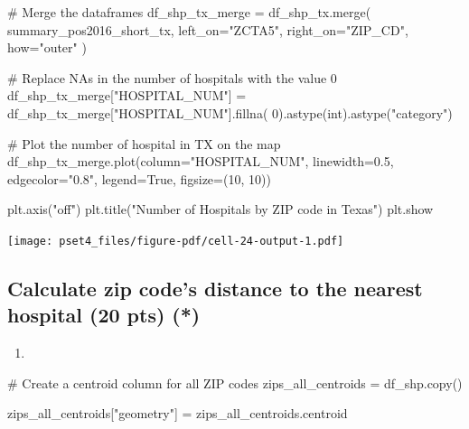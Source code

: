 \documentclass[
  letterpaper,
  DIV=11,
  numbers=noendperiod]{scrartcl}
\newenvironment{Shaded}{\begin{snugshade}}{\end{snugshade}}
\newcommand{\BuiltInTok}[1]{\textcolor[rgb]{0.00,0.23,0.31}{#1}}
\newcommand{\CommentTok}[1]{\textcolor[rgb]{0.37,0.37,0.37}{#1}}
\newcommand{\DecValTok}[1]{\textcolor[rgb]{0.68,0.00,0.00}{#1}}
\newcommand{\FloatTok}[1]{\textcolor[rgb]{0.68,0.00,0.00}{#1}}
\newcommand{\NormalTok}[1]{\textcolor[rgb]{0.00,0.23,0.31}{#1}}
\newcommand{\OperatorTok}[1]{\textcolor[rgb]{0.37,0.37,0.37}{#1}}
\newcommand{\StringTok}[1]{\textcolor[rgb]{0.13,0.47,0.30}{#1}}
\newcommand{\VariableTok}[1]{\textcolor[rgb]{0.07,0.07,0.07}{#1}}
\providecommand{\tightlist}{%
  \setlength{\itemsep}{0pt}\setlength{\parskip}{0pt}}\usepackage{longtable,booktabs,array}
\begin{document}
\begin{Shaded}
\begin{Highlighting}[]
\CommentTok{\# Merge the dataframes}
\NormalTok{df\_shp\_tx\_merge }\OperatorTok{=}\NormalTok{ df\_shp\_tx.merge(}
\NormalTok{    summary\_pos2016\_short\_tx,}
\NormalTok{    left\_on}\OperatorTok{=}\StringTok{"ZCTA5"}\NormalTok{,}
\NormalTok{    right\_on}\OperatorTok{=}\StringTok{"ZIP\_CD"}\NormalTok{,}
\NormalTok{    how}\OperatorTok{=}\StringTok{"outer"}
\NormalTok{)}

\CommentTok{\# Replace NAs in the number of hospitals with the value 0}
\NormalTok{df\_shp\_tx\_merge[}\StringTok{"HOSPITAL\_NUM"}\NormalTok{] }\OperatorTok{=}\NormalTok{ df\_shp\_tx\_merge[}\StringTok{"HOSPITAL\_NUM"}\NormalTok{].fillna(}
    \DecValTok{0}\NormalTok{).astype(}\BuiltInTok{int}\NormalTok{).astype(}\StringTok{"category"}\NormalTok{)}

\CommentTok{\# Plot the number of hospital in TX on the map}
\NormalTok{df\_shp\_tx\_merge.plot(column}\OperatorTok{=}\StringTok{"HOSPITAL\_NUM"}\NormalTok{, linewidth}\OperatorTok{=}\FloatTok{0.5}\NormalTok{,}
\NormalTok{                     edgecolor}\OperatorTok{=}\StringTok{"0.8"}\NormalTok{, legend}\OperatorTok{=}\VariableTok{True}\NormalTok{, figsize}\OperatorTok{=}\NormalTok{(}\DecValTok{10}\NormalTok{, }\DecValTok{10}\NormalTok{))}

\NormalTok{plt.axis(}\StringTok{"off"}\NormalTok{)}
\NormalTok{plt.title(}\StringTok{"Number of Hospitals by ZIP code in Texas"}\NormalTok{)}
\NormalTok{plt.show}
\end{Highlighting}
\end{Shaded}

\texttt{[image: pset4\_files/figure-pdf/cell-24-output-1.pdf]}

\subsection{Calculate zip code's distance to the nearest hospital (20
pts)
(*)}\label{calculate-zip-codes-distance-to-the-nearest-hospital-20-pts}

\begin{enumerate}
\def\labelenumi{\arabic{enumi}.}
\tightlist
\item
\end{enumerate}

\begin{Shaded}
\begin{Highlighting}[]
\CommentTok{\# Create a centroid column for all ZIP codes}
\NormalTok{zips\_all\_centroids }\OperatorTok{=}\NormalTok{ df\_shp.copy()}

\NormalTok{zips\_all\_centroids[}\StringTok{"geometry"}\NormalTok{] }\OperatorTok{=}\NormalTok{ zips\_all\_centroids.centroid}
\end{Highlighting}
\end{Shaded}
\end{document}
